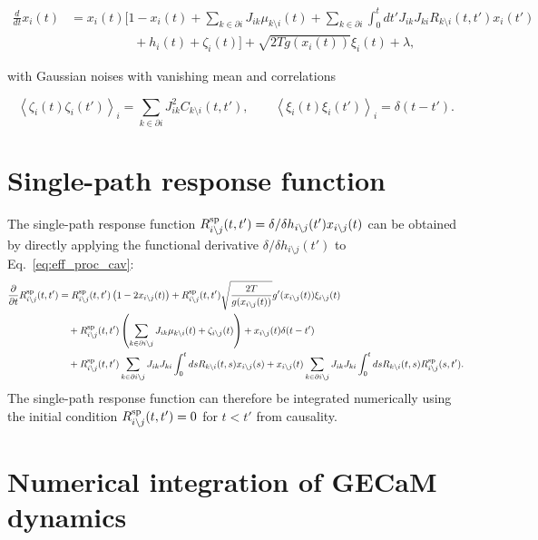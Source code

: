 \documentclass[
    preprint,
    linenumbers,
    amsmath,amssymb,amsfonts,
    aps, physrev,
    superscriptaddress,
    10pt,
    bibnotes
    ]{revtex4-2}
\begin{document}
\begin{align}
  \frac{d}{dt}x_{i}(t) & =x_{i}(t)\Biggl[1-x_{i}(t)+\sum_{k\in\partial i}J_{ik}\mu_{k\setminus i}(t) + \sum_{k\in\partial i}\int_{0}^{t}dt'J_{ik}J_{ki}R_{k\setminus i}(t,t')x_{i}(t') \nonumber \\
   & \qquad\quad \qquad + h_{i}(t)+\zeta_{i}(t)\Biggr]+\sqrt{2Tg(x_{i}(t))}\xi_{i}(t)+\lambda,
\end{align}

with Gaussian noises with vanishing mean and correlations

\begin{equation}
  \left\langle \zeta_{i}(t)\zeta_{i}(t')\right\rangle _{i}=\sum_{k\in\partial i}J_{ik}^{2}C_{k\setminus i}(t,t'),\qquad\left\langle \xi_{i}(t)\xi_{i}(t')\right\rangle _{i}=\delta(t-t').
\end{equation}


\section{Single-path response function}\label{app:response}
The single-path response function $R^{\rm sp}_{i\setminus j}(t,t')=\delta/\delta h_{i\setminus j}(t') x_{i\setminus j}(t) $ can be obtained by directly applying the functional derivative $\delta/\delta h_{i\setminus j}(t')$ to Eq.~\eqref{eq:eff_proc_cav}:
\begin{align}
  \frac{\partial}{\partial t}R^{\rm sp}_{i\setminus j}(t,t')&=R^{\rm sp}_{i\setminus j}(t,t')\left(1-2x_{i\setminus j}(t)\right)+R^{\rm sp}_{i\setminus j}(t,t')\sqrt{\frac{2T}{g(x_{i\setminus j}(t))}}g'(x_{i\setminus j}(t))\xi_{i\setminus j}(t)\nonumber\\
  &\quad + R^{\rm sp}_{i\setminus j}(t,t')\left(\sum_{k\in\partial i \setminus j}J_{ik}\mu_{k\setminus i}(t)+\zeta_{i\setminus j}(t) \right)+x_{i\setminus j}(t)\delta(t-t')\nonumber\\
  &\quad + R^{\rm sp}_{i\setminus j}(t,t')\sum_{k \in \partial i \setminus j}J_{ik}J_{ki}\int_0^t dsR_{k\setminus i}(t,s)x_{i\setminus j}(s)+x_{i\setminus j}(t)\sum_{k\in \partial i \setminus j}J_{ik}J_{ki}\int_0^t ds R_{k\setminus i}(t,s)R^{\rm sp}_{i\setminus j}(s,t'). \label{eq:single_path_response}
\end{align}
The single-path response function can therefore be integrated numerically using the initial condition $R^{\rm sp}_{i\setminus j}(t,t')=0$ for $t<t'$ from causality.

\section{Numerical integration of GECaM dynamics}\label{app:numerical_integration}
\end{document}
